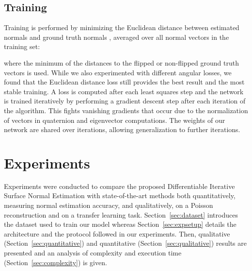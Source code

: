 \documentclass[10pt,twocolumn,letterpaper]{article}
\begin{document}
\subsection{Training}
Training is performed by minimizing the Euclidean distance between estimated normals  and ground truth normals , averaged over all normal vectors in the training set:

where the minimum of the distances to the flipped or non-flipped ground truth vectors is used. While we also experimented with different angular losses, we found that the Euclidean distance loss still provides the best result and the most stable training.   A loss is computed after each least squares step and the network is trained iteratively by performing a gradient descent step after each iteration of the algorithm. This fights vanishing gradients that occur due to the normalization of vectors in quaternion and eigenvector computations. The weights of our network are shared over iterations, allowing generalization to further iterations.



\section{Experiments}


Experiments were conducted to compare the proposed Differentiable Iterative Surface
Normal Estimation with state-of-the-art methods both quantitatively,
measuring normal estimation accuracy, and qualitatively, on a Poisson
reconstruction and on a transfer learning task.
Section~\ref{sec:dataset} introduces the dataset used to train our model whereas
Section~\ref{sec:expsetup} details the architecture and the protocol
followed in our experiments. Then, qualitative (Section~\ref{sec:quantitative}) and quantitative (Section~\ref{sec:qualitative}) results are presented and an analysis of complexity and execution time (Section~\ref{sec:complexity}) is given.
\end{document}
